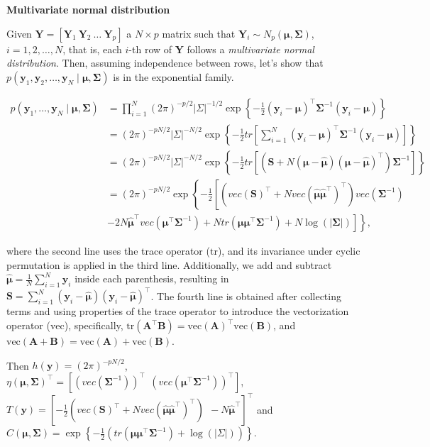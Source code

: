 \begin{enumerate}
\textbf{Multivariate normal distribution}

Given $\bm{Y}=[\bm{Y}_1 \ \bm{Y}_2 \ \dots \ \bm{Y}_p]$ a $N\times p$ matrix such that $\bm{Y}_i\sim N_p(\bm{\mu},\bm{\Sigma})$, $i=1,2,\dots,N$, that is, each $i$-th row of $\bm{Y}$ follows a \textit{multivariate normal distribution}. Then, assuming independence between rows, let's show that $p(\bm{y}_1,\bm{y}_2,\dots,\bm{y}_N\mid \bm{\mu},\bm{\Sigma})$ is in the exponential family.

{\footnotesize{
\begin{align}
	p(\bm{y}_1,\dots,\bm{y}_N\mid \bm{\mu},\bm{\Sigma})&=\prod_{i=1}^N (2\pi)^{-p/2}| \Sigma|^{-1/2}\exp\left\{-\frac{1}{2}\left(\bm{y}_i-\bm{\mu}\right)^{\top}\bm{\Sigma}^{-1}\left(\bm{y}_i-\bm{\mu}\right)\right\}\nonumber\\
	&= (2\pi)^{-pN/2}|\Sigma|^{-N/2}\exp\left\{-\frac{1}{2}tr\left[\sum_{i=1}^N\left(\bm{y}_i-\bm{\mu}\right)^{\top}\bm{\Sigma}^{-1}\left(\bm{y}_i-\bm{\mu}\right)\right]\right\}\nonumber\\
	&= (2\pi)^{-p N/2}|\Sigma|^{-N/2}\exp\left\{-\frac{1}{2}tr\left[\left(\bm{S}+N\left(\bm{\mu}-\hat{\bm{\mu}}\right)\left(\bm{\mu}-\hat{\bm{\mu}}\right)^{\top}\right)\bm{\Sigma}^{-1}\right]\right\}\nonumber\\
	&= (2\pi)^{-p N/2}\exp\left\{-\frac{1}{2}\left[\left(vec\left(\bm{S}\right)^{\top}+N vec\left(\hat{\bm{\mu}}\hat{\bm{\mu}}^{\top}\right)^{\top}\right)vec \left(\bm{\Sigma}^{-1}\right)\right.\right.\nonumber\\
	&\left.\left.-2N\hat{\bm{\mu}}^{\top}vec\left(\bm{\mu}^{\top}\bm{\Sigma}^{-1}\right)+N tr\left(\bm{\mu}\bm{\mu}^{\top}\bm{\Sigma}^{-1}\right)+N\log (|\bm{\Sigma}|)\right]\right\}\nonumber,
\end{align}
}}

where the second line uses the trace operator ($\text{tr}$), and its invariance under cyclic permutation is applied in the third line. Additionally, we add and subtract $\hat{\bm{\mu}} = \frac{1}{N}\sum_{i=1}^N \bm{y}_i$ inside each parenthesis, resulting in $\bm{S} = \sum_{i=1}^N \left(\bm{y}_i - \hat{\bm{\mu}}\right) \left(\bm{y}_i - \hat{\bm{\mu}}\right)^{\top}$. The fourth line is obtained after collecting terms and using properties of the trace operator to introduce the vectorization operator ($\text{vec}$), specifically, $ \text{tr}(\bm{A}^{\top}\bm{B}) = \text{vec}(\bm{A})^{\top} \text{vec}(\bm{B})$, and $ \text{vec}(\bm{A} + \bm{B}) = \text{vec}(\bm{A}) + \text{vec}(\bm{B})$.

Then $h(\bm{y})=(2\pi)^{-pN/2}$, $\eta(\bm{\mu},\bm{\Sigma})^{\top}=\left[\left(vec\left(\bm{\Sigma}^{-1}\right)\right)^{\top} \ \ \left(vec\left(\bm{\mu}^{\top}\bm{\Sigma}^{-1}\right)\right)^{\top}\right]$, $T(\bm{y})=\left[-\frac{1}{2}\left(vec\left(\bm{S}\right)^{\top}+N vec\left(\hat{\bm{\mu}}\hat{\bm{\mu}}^{\top}\right)^{\top}\right) \ \ -N\hat{\bm{\mu}}^{\top}\right]^{\top}$ and $C(\bm{\mu},\bm{\Sigma})=\exp\left\{-\frac{1}{2}\left(tr\left(\bm{\mu}\bm{\mu}^{\top}\bm{\Sigma}^{-1}\right)+\log(|\Sigma|)\right)\right\}$.
\end{enumerate}

